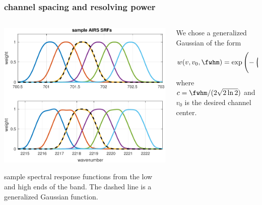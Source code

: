 \begin{frame} %
\frametitle{channel spacing and resolving power}
\begin{columns}[t]
\begin{column}{0.5\textwidth}

 \includegraphics[width=\textwidth]{figures/airs_sample_SRF.pdf}

  sample {\airs} spectral response functions from the low and high
  ends of the band.  The dashed line is a generalized Gaussian
  function.

\end{column}
\begin{column}{0.5\textwidth}  
We chose a generalized Gaussian 
\cite{wiki:gauss} of the form
\[w(v, v_0, \fwhm) = 
\exp\left(-\left(\frac{(v - v_0)^2}{2c^2}\right)^{1.5}\right) \]
where $c=\fwhm / (2\sqrt{2\ln 2})$ and $v_0$ is the desired channel
center.  
\end{column}
\end{columns}
\end{frame} %
